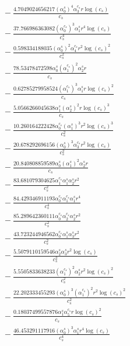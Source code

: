 \documentclass[10pt]{article}
\begin{document}
\begin{align*}
&{}  - \frac{4.7049024656217 \left(\alpha_{0}^s\right)^{4} \alpha_{3}^{c_s} r \log{\left(c_{s} \right)}}{c_{s}} \\
&{}  - \frac{37.766986363082 \left(\alpha_{0}^{c_s}\right)^{3} \alpha_{1}^s r^{4} \log{\left(c_{s} \right)}}{c_{s}^{4}} \\
&{}  - \frac{0.598334188035 \left(\alpha_{0}^s\right)^{2} \alpha_{4}^{c_s} r^{2} \log{\left(c_{s} \right)}^{2}}{c_{s}^{2}} \\
&{}  - \frac{78.53478472598 \alpha_{0}^s \left(\alpha_{1}^{c_s}\right)^{2} \alpha_{2}^s r}{c_{s}} \\
&{}  - \frac{0.62785279958524 \left(\alpha_{1}^{c_s}\right)^{3} \alpha_{1}^s r \log{\left(c_{s} \right)}^{2}}{c_{s}} \\
&{}  - \frac{5.0566266045638 \alpha_{1}^s \left(\alpha_{2}^s\right)^{2} r \log{\left(c_{s} \right)}^{3}}{c_{s}} \\
&{}  - \frac{10.260164222428 \alpha_{0}^{c_s} \left(\alpha_{1}^s\right)^{3} r^{2} \log{\left(c_{s} \right)}^{3}}{c_{s}^{2}} \\
&{}  - \frac{20.678292696156 \left(\alpha_{0}^s\right)^{3} \alpha_{3}^{c_s} r^{2} \log{\left(c_{s} \right)}}{c_{s}^{2}} \\
&{}  - \frac{20.840808859589 \alpha_{0}^s \left(\alpha_{1}^s\right)^{2} \alpha_{2}^s r}{c_{s}} \\
&{}  - \frac{83.681079304625 \alpha_{1}^{c_s} \alpha_{1}^s \alpha_{2}^s r^{2}}{c_{s}^{2}} \\
&{}  - \frac{84.429346911193 \alpha_{0}^{c_s} \alpha_{1}^{c_s} \alpha_{1}^s r^{4}}{c_{s}^{4}} \\
&{}  - \frac{85.289642360111 \alpha_{0}^{c_s} \alpha_{2}^{c_s} \alpha_{2}^s r^{2}}{c_{s}^{2}} \\
&{}  - \frac{43.723244946562 \alpha_{0}^{c_s} \alpha_{1}^s \alpha_{3}^s r^{2}}{c_{s}^{2}} \\
&{}  - \frac{5.5079110159546 \alpha_{2}^s \alpha_{3}^s r^{2} \log{\left(c_{s} \right)}}{c_{s}^{2}} \\
&{}  - \frac{5.5505833638233 \left(\alpha_{1}^{c_s}\right)^{2} \alpha_{2}^s r^{2} \log{\left(c_{s} \right)}^{2}}{c_{s}^{2}} \\
&{}  - \frac{22.202333455293 \left(\alpha_{0}^s\right)^{3} \left(\alpha_{1}^{c_s}\right)^{2} r^{2} \log{\left(c_{s} \right)}^{2}}{c_{s}^{2}} \\
&{}  - \frac{0.18037499557876 \alpha_{1}^s \alpha_{5}^{c_s} r \log{\left(c_{s} \right)}^{2}}{c_{s}} \\
&{}  - \frac{46.453291117916 \left(\alpha_{0}^s\right)^{3} \alpha_{1}^s r^{4} \log{\left(c_{s} \right)}}{c_{s}^{4}} \\

\end{align*}
\end{document}
